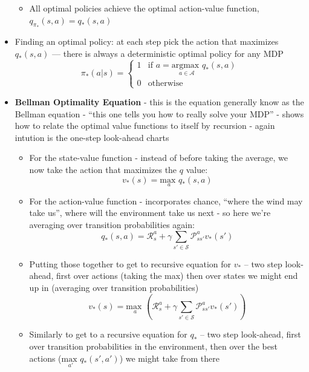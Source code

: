 \documentclass{article}
\begin{document}
\begin{itemize}
\begin{itemize}
        \item All optimal policies achieve the optimal action-value function, \\$q_{\pi_*}(s, a)=q_*(s, a)$
    \end{itemize}
    \item Finding an optimal policy: at each step pick the action that maximizes $q_*(s, a)$ --- there is always a deterministic optimal policy for any MDP
    \begin{equation}
        \pi_*(a|s)=
        \begin{cases}
            1 &\text{if } a=\underset{a \in \mathcal{A}}{\text{argmax }} q_*(s, a) \\
            0 &\text{otherwise}
        \end{cases}
    \end{equation}
    \item \textbf{Bellman Optimality Equation} - this is the equation generally know as the Bellman equation - ``this one tells you how to really solve your MDP'' - shows how to relate the optimal value functions to itself by recursion - again intution is the one-step look-ahead charts
    \begin{itemize}
        \item For the state-value function - instead of before taking the average, we now take the action that maximizes the $q$ value:
        \begin{equation}
            v_*(s)=\underset{a}{\text{max }}q_*(s, a)
        \end{equation}
        \item For the action-value function - incorporates chance, ``where the wind may take us'', where will the environment take us next - so here we're averaging over transition probabilities again:
        \begin{equation}
            q_*(s, a)=\mathcal{R}^a_s+\gamma \sum_{s'\in \mathcal{S}}\mathcal{P}^a_{ss'}v_*(s')
        \end{equation}
        \item Putting those together to get to recursive equation for $v_*$ -- two step look-ahead, first over actions (taking the max) then over states we might end up in (averaging over transition probabilities)
        \begin{equation}
            v_*(s)=\underset{a}{\text{max }} \left( \mathcal{R}^a_s+\gamma \sum_{s'\in \mathcal{S}}\mathcal{P}^a_{ss'}v_*(s') \right)
        \end{equation}
        \item Similarly to get to a recursive equation for $q_*$ -- two step look-ahead, first over transition probabilities in the environment, then over the best actions ($\underset{a'}{\text{max }}q_*(s', a')$) we might take from there

\end{itemize}
\end{itemize}
\end{document}
